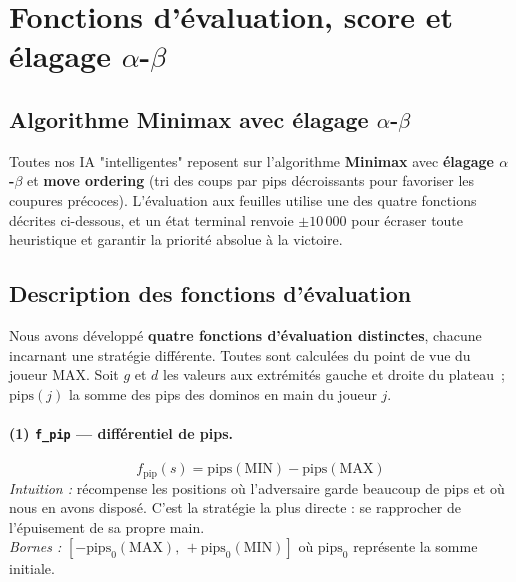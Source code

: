 \documentclass[11pt,a4paper]{article}
\begin{document}
\section{Fonctions d'évaluation, score et élagage \(\alpha\)-\(\beta\)}

\subsection{Algorithme Minimax avec élagage \(\alpha\)-\(\beta\)}

Toutes nos IA "intelligentes" reposent sur l'algorithme \textbf{Minimax} avec
\textbf{élagage \(\alpha\)-\(\beta\)} et \textbf{move ordering} (tri des coups par
pips décroissants pour favoriser les coupures précoces). L'évaluation aux feuilles
utilise une des quatre fonctions décrites ci-dessous, et un état terminal renvoie
$\pm 10\,000$ pour écraser toute heuristique et garantir la priorité absolue à la
victoire.

\subsection{Description des fonctions d'évaluation}

Nous avons développé \textbf{quatre fonctions d'évaluation distinctes}, chacune
incarnant une stratégie différente. Toutes sont calculées du point de vue du joueur
MAX. Soit $g$ et $d$ les valeurs aux extrémités gauche et droite du plateau~;
$\text{pips}(j)$ la somme des pips des dominos en main du joueur $j$.

\paragraph{(1) \texttt{f\_pip} --- différentiel de pips.}
\[
    f_{\text{pip}}(s) = \text{pips}(\text{MIN}) - \text{pips}(\text{MAX})
\]
\textit{Intuition :} récompense les positions où l'adversaire garde beaucoup de pips
et où nous en avons disposé. C'est la stratégie la plus directe : se rapprocher de
l'épuisement de sa propre main.\\
\textit{Bornes :} $\left[-\text{pips}_0(\text{MAX}),\, +\text{pips}_0(\text{MIN})\right]$
où $\text{pips}_0$ représente la somme initiale.
\end{document}

